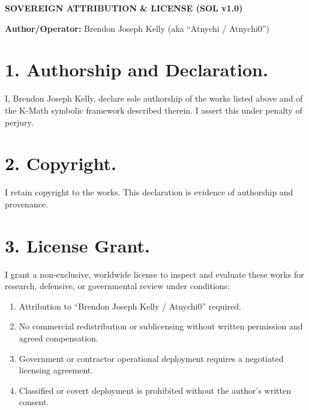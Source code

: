 \documentclass[11pt, a4paper]{article}
\begin{document}
\pagestyle{empty}

\begin{center}
    \Large \textbf{SOVEREIGN ATTRIBUTION \& LICENSE (SOL v1.0)}
\end{center}

\vspace{0.5cm}

\begin{Form}

\noindent \textbf{Author/Operator:} Brendon Joseph Kelly (aka ``Atnychi / Atnychi0'')

\vspace{0.5cm}

\noindent {}

\vspace{0.5cm}

\noindent {}

\vspace{1cm}

\section*{1. Authorship and Declaration.}
I, Brendon Joseph Kelly, declare sole authorship of the works listed above and of the K-Math symbolic framework described therein. I assert this under penalty of perjury.

\section*{2. Copyright.}
I retain copyright to the works. This declaration is evidence of authorship and provenance.

\section*{3. License Grant.}
I grant a non-exclusive, worldwide license to inspect and evaluate these works for research, defensive, or governmental review under conditions:
\begin{enumerate}[label=\alph*.]
    \item Attribution to ``Brendon Joseph Kelly / Atnychi0'' required.
    \item No commercial redistribution or sublicensing without written permission and agreed compensation.
    \item Government or contractor operational deployment requires a negotiated licensing agreement.
    \item Classified or covert deployment is prohibited without the author's written consent.
\end{enumerate}


\end{Form}
\end{document}
